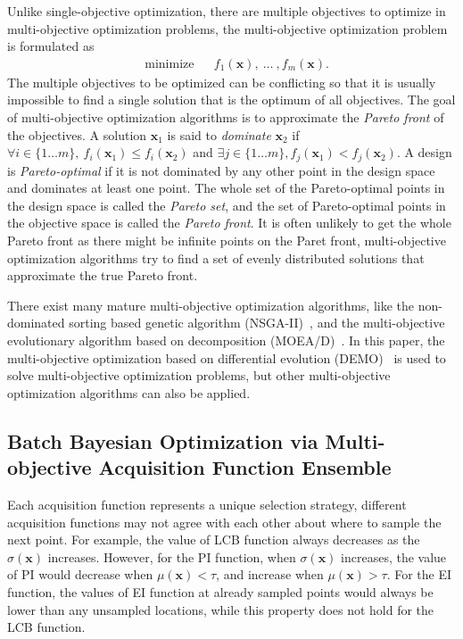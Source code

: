 Unlike single-objective optimization, there are multiple objectives to optimize in multi-objective optimization problems\cite{MO_overview}, the multi-objective optimization problem is formulated as
\begin{equation}
    \label{eq:MOFormulation}
    \begin{aligned}
        & \text{minimize} & & f_1(\bm{x}),~\dots~,f_m(\bm{x}).
    \end{aligned}
\end{equation}
The multiple objectives to be optimized can be conflicting so that it is usually impossible to find a single solution that is the optimum of all objectives. The goal of multi-objective optimization algorithms is to approximate the \emph{Pareto front} of the objectives. A solution $\bm{x}_1$ is said to \emph{dominate} $\bm{x}_2$ if $\forall i \in \{1\dots m\},~f_i(\bm{x}_1) \le f_i(\bm{x}_2)$ and $\exists j \in \{1\dots m\}, f_j(\bm{x}_1) < f_j(\bm{x}_2)$. A design is \emph{Pareto-optimal} if it is not dominated by any other point in the design space and dominates at least one point. The whole set of the Pareto-optimal points in the design space is called the \emph{Pareto set}, and the set of Pareto-optimal points in the objective space is called the \emph{Pareto front}. It is often unlikely to get the whole Pareto front as there might be infinite points on the Paret front, multi-objective optimization algorithms try to find a set of evenly distributed solutions that approximate the true Pareto front.

There exist many mature multi-objective optimization algorithms, like the non-dominated sorting based genetic algorithm (NSGA-II)~\cite{nsgaii}, and the multi-objective evolutionary algorithm based on decomposition (MOEA/D)~\cite{moead}. In this paper, the multi-objective optimization based on differential evolution (DEMO)~\cite{demo} is used to solve multi-objective optimization problems, but other multi-objective optimization algorithms can also be applied.

\subsection{Batch Bayesian Optimization via Multi-objective Acquisition Function Ensemble}

Each acquisition function represents a unique selection strategy, different acquisition functions may not agree with each other about where to sample the next point. For example, the value of LCB function always decreases as the $\sigma(\bm{x})$ increases. However, for the PI function, when $\sigma(\bm{x})$ increases, the value of PI would decrease when $\mu(\bm{x}) < \tau$, and increase when $\mu(\bm{x}) > \tau$. For the EI function, the values of EI function at already sampled points would always be lower than any unsampled locations, while this property does not hold for the LCB function.



